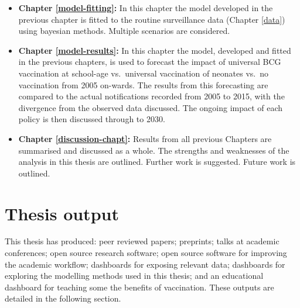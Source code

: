 \documentclass[11pt,twoside]{bristolthesis}
\begin{document}
\begin{itemize}
  \item
    \textbf{Chapter \ref{model-fitting}:} In this chapter the model developed in the previous chapter is fitted to the routine surveillance data (Chapter \ref{data}) using bayesian methods. Multiple scenarios are considered.
  \item
    \textbf{Chapter \ref{model-results}:} In this chapter the model, developed and fitted in the previous chapters, is used to forecast the impact of universal BCG vaccination at school-age vs.~universal vaccination of neonates vs.~no vaccination from 2005 on-wards. The results from this forecasting are compared to the actual notifications recorded from 2005 to 2015, with the divergence from the observed data discussed. The ongoing impact of each policy is then discussed through to 2030.
  \item
    \textbf{Chapter \ref{discussion-chapt}:} Results from all previous Chapters are summarised and discussed as a whole. The strengths and weaknesses of the analysis in this thesis are outlined. Further work is suggested. Future work is outlined.
  \end{itemize}
  \hypertarget{thesis-output}{%
  \section{Thesis output}\label{thesis-output}}
  
  This thesis has produced: peer reviewed papers; preprints; talks at academic conferences; open source research software; open source software for improving the academic workflow; dashboards for exposing relevant data; dashboards for exploring the modelling methods used in this thesis; and an educational dashboard for teaching some the benefits of vaccination. These outputs are detailed in the following section.
  
\end{document}
